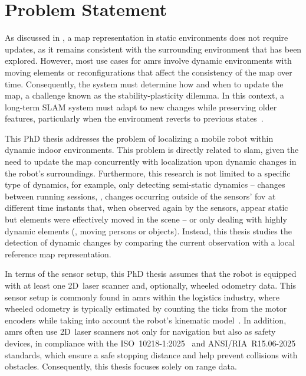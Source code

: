 \section{Problem Statement}\label{sec:intro:problem}

As discussed in ,
a map representation in static environments does not require updates, as it
remains consistent with the surrounding environment that has been explored.
However, most use cases for \glspl{amr} involve dynamic environments with moving
elements or reconfigurations that affect the consistency of the map over time.
Consequently, the system must determine how and when to update the map, a
challenge known as the stability-plasticity dilemma. In this context, a
long-term SLAM system must adapt to new changes while preserving older features,
particularly when the environment reverts to previous
states~\cite{biber-duckett:ijrr:2009}.

This PhD thesis addresses the problem of localizing a mobile robot within
dynamic indoor environments. This problem is directly related to \gls{slam},
given the need to update the map concurrently with localization upon
dynamic changes in the robot's surroundings.
Furthermore, this research is not limited to a specific type of dynamics,
for example, only detecting semi-static dynamics --
changes between running sessions, \ie, changes occurring outside of the sensors'
\gls{fov} at different time instants that, when observed again by the sensors,
appear static but elements were effectively moved in the scene -- or only
dealing with highly dynamic elements (\eg, moving persons or objects).
Instead, this thesis studies the detection of dynamic changes by comparing the
current observation with a local reference map representation.

In terms of the sensor setup, this PhD thesis assumes that the robot is equipped
with at least one 2D~laser scanner and, optionally, wheeled odometry data.
This sensor setup is commonly found in \glspl{amr} within the logistics
industry, where wheeled odometry is typically estimated by counting the ticks
from the motor encoders while taking into account the robot's kinematic
model~\cite{sousa:jint:2022}.
In addition, \glspl{amr} often use 2D~laser scanners not only for navigation
but also as safety devices, in compliance with the
ISO~10218-1:2025~\cite{iso-10218-1:2025} and
ANSI/RIA~R15.06-2025~\cite{ansi/ria-r15.06:2025} standards, which ensure a
safe stopping distance and help prevent collisions with obstacles.
Consequently, this thesis focuses solely on range data.

